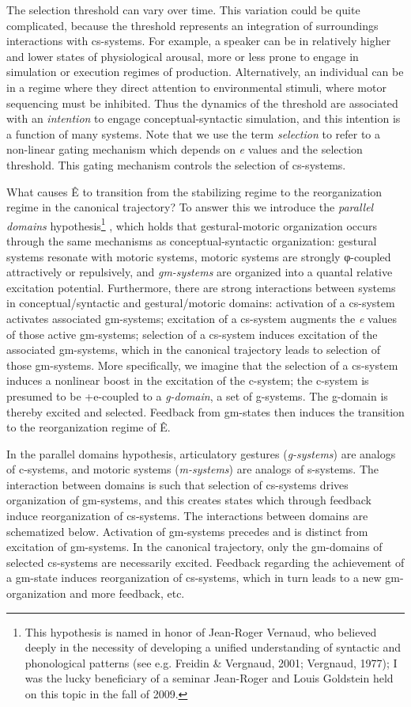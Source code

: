   The selection threshold can vary over time. This variation could be quite complicated, because the threshold represents an integration of surroundings interactions with cs-systems. For example, a speaker can be in relatively higher and lower states of physiological arousal, more or less prone to engage in simulation or execution regimes of production. Alternatively, an individual can be in a regime where they direct attention to environmental stimuli, where motor sequencing must be inhibited. Thus the dynamics of the threshold are associated with an \textit{intention} to engage conceptual-syntactic simulation, and this intention is a function of many systems. Note that we use the term \textit{selection} to refer to a non-linear gating mechanism which depends on \textit{e} values and the selection threshold. This gating mechanism controls the selection of cs-systems.

  What causes Ê to transition from the stabilizing regime to the reorganization regime in the canonical trajectory? To answer this we introduce the \textit{parallel} \textit{domains} hypothesis\footnote{This hypothesis is named in honor of Jean-Roger Vernaud, who believed deeply in the necessity of developing a unified understanding of syntactic and phonological patterns (see e.g. Freidin \& Vergnaud, 2001; Vergnaud, 1977); I was the lucky beneficiary of a seminar Jean-Roger and Louis Goldstein held on this topic in the fall of 2009.} , which holds that gestural-motoric organization occurs through the same mechanisms as conceptual-syntactic organization: gestural systems resonate with motoric systems, motoric systems are strongly φ-coupled attractively or repulsively, and \textit{gm-systems} are organized into a quantal relative excitation potential. Furthermore, there are strong interactions between systems in conceptual/syntactic and gestural/motoric domains: activation of a cs-system activates associated gm-systems; excitation of a cs-system augments the \textit{e} values of those active gm-systems; selection of a cs-system induces excitation of the associated gm-systems, which in the canonical trajectory leads to selection of those gm-systems. More specifically, we imagine that the selection of a cs-system induces a nonlinear boost in the excitation of the c-system; the c-system is presumed to be +e-coupled to a \textit{g-domain}, a set of g-systems. The g-domain is thereby excited and selected. Feedback from gm-states then induces the transition to the reorganization regime of  Ê.

  In the parallel domains hypothesis, articulatory gestures (\textit{g-systems}) are analogs of c-systems, and motoric systems (\textit{m-systems}) are analogs of s-systems. The interaction between domains is such that selection of cs-systems drives organization of gm-systems, and this creates states which through feedback induce reorganization of cs-systems. The interactions between domains are schematized below. Activation of gm-systems precedes and is distinct from excitation of gm-systems. In the canonical trajectory, only the gm-domains of selected cs-systems are necessarily excited. Feedback regarding the achievement of a gm-state induces reorganization of cs-systems, which in turn leads to a new gm-organization and more feedback, etc.

